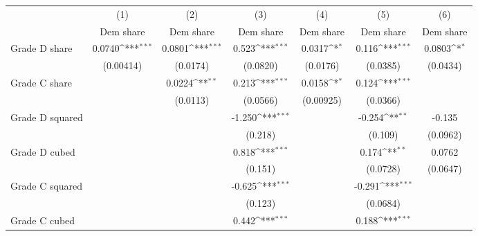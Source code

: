 {
\def\sym#1{\ifmmode^{#1}\else\(^{#1}\)\fi}
\begin{tabular}{l*{6}{c}}
\toprule
                    &\multicolumn{1}{c}{(1)}&\multicolumn{1}{c}{(2)}&\multicolumn{1}{c}{(3)}&\multicolumn{1}{c}{(4)}&\multicolumn{1}{c}{(5)}&\multicolumn{1}{c}{(6)}\\
                    &\multicolumn{1}{c}{Dem share}&\multicolumn{1}{c}{Dem share}&\multicolumn{1}{c}{Dem share}&\multicolumn{1}{c}{Dem share}&\multicolumn{1}{c}{Dem share}&\multicolumn{1}{c}{Dem share}\\
\midrule
Grade D share       &      0.0740\sym{***}&      0.0801\sym{***}&       0.523\sym{***}&      0.0317\sym{*}  &       0.116\sym{***}&      0.0803\sym{*}  \\
                    &   (0.00414)         &    (0.0174)         &    (0.0820)         &    (0.0176)         &    (0.0385)         &    (0.0434)         \\
\addlinespace
Grade C share       &                     &      0.0224\sym{**} &       0.213\sym{***}&      0.0158\sym{*}  &       0.124\sym{***}&                     \\
                    &                     &    (0.0113)         &    (0.0566)         &   (0.00925)         &    (0.0366)         &                     \\
\addlinespace
Grade D squared     &                     &                     &      -1.250\sym{***}&                     &      -0.254\sym{**} &      -0.135         \\
                    &                     &                     &     (0.218)         &                     &     (0.109)         &    (0.0962)         \\
\addlinespace
Grade D cubed       &                     &                     &       0.818\sym{***}&                     &       0.174\sym{**} &      0.0762         \\
                    &                     &                     &     (0.151)         &                     &    (0.0728)         &    (0.0647)         \\
\addlinespace
Grade C squared     &                     &                     &      -0.625\sym{***}&                     &      -0.291\sym{***}&                     \\
                    &                     &                     &     (0.123)         &                     &    (0.0684)         &                     \\
\addlinespace
Grade C cubed       &                     &                     &       0.442\sym{***}&                     &       0.188\sym{***}&                     \\

\end{tabular}}
